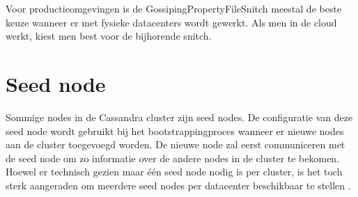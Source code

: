 Voor productieomgevingen is de GossipingPropertyFileSnitch meestal de beste keuze wanneer er met fysieke datacenters wordt gewerkt.
Als men in de cloud werkt, kiest men best voor de bijhorende snitch.

\section{Seed node}
Sommige nodes in de Cassandra cluster zijn seed nodes.
De configuratie van deze seed node wordt gebruikt bij het bootstrappingproces wanneer er nieuwe nodes aan de cluster toegevoegd worden.
De nieuwe node zal eerst communiceren met de seed node om zo informatie over de andere nodes in de cluster te bekomen.
Hoewel er technisch gezien maar één seed node nodig is per cluster, is het toch sterk aangeraden om meerdere seed nodes per datacenter beschikbaar te stellen \citep{kan2014cassandra}.